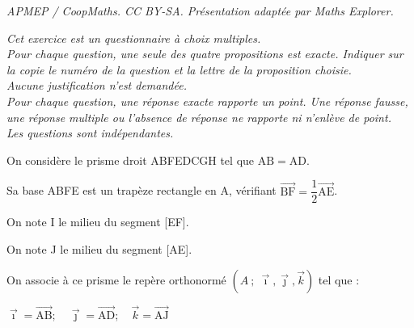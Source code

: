 \documentclass[10pt]{article}
\providecommand{\vect}[1]{\overrightarrow{#1}}
\begin{document}
\noindent\textit{APMEP / CoopMaths. CC BY-SA. Présentation adaptée par Maths Explorer.}\par\medskip
\emph{Cet exercice est un questionnaire à choix multiples.\\
Pour chaque question, une seule des quatre propositions est exacte. Indiquer sur la copie le numéro de la question et la lettre de la proposition choisie.\\
Aucune justification n'est demandée.\\
Pour chaque question, une réponse exacte rapporte un point. Une réponse fausse, une réponse multiple ou l'absence de réponse ne rapporte ni n'enlève de point.\\
Les questions sont indépendantes.}

\bigskip

On considère le prisme droit ABFEDCGH tel que $\mathrm{AB} = \mathrm{AD}$.

Sa base ABFE est un trapèze rectangle en A, vérifiant $\vect{\mathrm{BF}} = \dfrac{1}{2} \vect{\mathrm{AE}}$.

On note I le milieu du segment [EF].

On note J le milieu du segment [AE].

On associe à ce prisme le repère orthonormé $\left(A~;~ \vect{\imath}, \vect{\jmath}, \vect{k}\right)$ tel que :

$\vect{\imath} = \vect{\mathrm{AB}} ;\quad \vect{\jmath} = \vect{\mathrm{AD}} ;\quad \vect{k} = \vect{\mathrm{AJ}}$

\begin{center}
\end{center}
\end{document}

